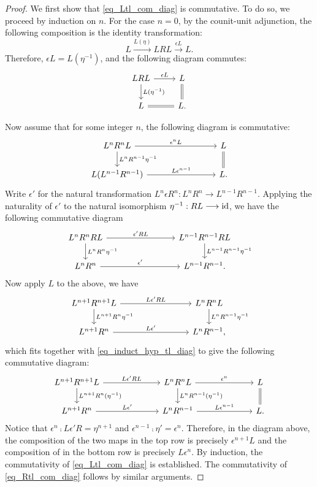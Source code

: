 \begin{proof}
We first show that \eqref{eq_Ltl_com_diag} is commutative.
To do so, we proceed by induction on $n$. For the case $n = 0$, 
by the counit-unit adjunction, the following composition is
the identity transformation:
\[
L \stackrel{L(\eta)}{\to} LRL \stackrel{\epsilon L}{\to} 
   L.
\]
Therefore, $\epsilon L = L(\eta^{-1})$, and the
following diagram commutes:
\[
\begin{tikzcd}
LRL \arrow{r}{\epsilon L} \arrow{d}{L(\eta^{-1})} &
L \arrow[equals]{d} \\
L \arrow[equals]{r} & L.
\end{tikzcd}
\]

Now assume that for some integer $n$, the following diagram is 
commutative:
\begin{equation}\label{eq_induct_hyp_tl_diag}
\begin{tikzcd}[column sep=80pt]
L^{n}R^{n}L \arrow{r}{\epsilon^{n}L} \arrow{d}{L^nR^{n - 1}\eta^{-1}} &
L \arrow[equals]{d} \\
L(L^{n - 1}R^{n - 1}) \arrow{r}{L\epsilon^{n - 1}} &
L.
\end{tikzcd}
\end{equation}
Write $\epsilon'$ for the natural transformation $L^n \epsilon R^n:
L^n R^n \to L^{n - 1} R^{n - 1}$. Applying the naturality of 
$\epsilon'$ to the natural isomorphism $\eta^{-1}: RL \longrightarrow \mathrm{id}$, we 
have the following commutative diagram
\[
\begin{tikzcd}[column sep=80pt]
L^n R^n RL \arrow{r}{\epsilon'RL} 
   \arrow{d}{L^nR^n \eta^{-1}} &
L^{n - 1}R^{n - 1} RL
   \arrow{d}{L^{n - 1}R^{n - 1}\eta^{-1}} \\
L^nR^n \arrow{r}{\epsilon'} &
L^{n - 1}R^{n - 1}.
\end{tikzcd}
\]
Now apply $L$ to the above, we have
\[
\begin{tikzcd}[column sep=80pt]
L^{n + 1} R^{n + 1} L \arrow{r}{L\epsilon'RL} 
   \arrow{d}{L^{n + 1}R^n \eta^{-1}} &
L^{n}R^n L \arrow{d}{L^nR^{n - 1}\eta^{-1}} \\
L^{n + 1}R^n \arrow{r}{L\epsilon'} &
L^{n}R^{n - 1},
\end{tikzcd}
\]
which fits together with \eqref{eq_induct_hyp_tl_diag} to give the 
following commutative diagram:
\[
\begin{tikzcd}[column sep=65pt]
L^{n + 1} R^{n + 1} L \arrow{r}{L\epsilon' RL} 
   \arrow{d}{L^{n + 1}R^n(\eta^{-1})} &
L^{n}R^n L \arrow{d}{L^nR^{n - 1}(\eta^{-1})}
   \arrow{r}{\epsilon^{n}} &
L \arrow[equals]{d} \\
L^{n + 1}R^n \arrow{r}{L\epsilon'} &
L^{n}R^{n - 1} \arrow{r}{L\epsilon^{n - 1}} &
L.
\end{tikzcd}
\]
Notice that $\epsilon^n \comp L\epsilon'R = \eta^{n + 1}$ and 
$\epsilon^{n - 1} \comp \eta' = \epsilon^{n}$. Therefore, in the 
diagram above, the composition of the two maps in the top row
is precisely $\epsilon^{n + 1} L$ and the composition of in the
bottom row is precisely $L \epsilon^n$. By induction, the 
commutativity of \eqref{eq_Ltl_com_diag} is established. The 
commutativity of \eqref{eq_Rtl_com_diag} follows by similar 
arguments.
\end{proof}

